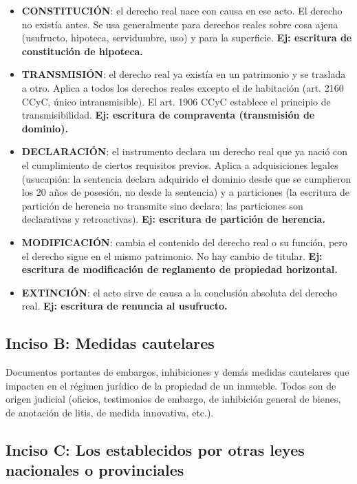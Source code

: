 \documentclass[12pt,oneside]{book}
\begin{document}
\begin{itemize}
    \item \textbf{CONSTITUCIÓN}: el derecho real nace con causa en ese acto. El derecho no existía antes. Se usa generalmente para derechos reales sobre cosa ajena (usufructo, hipoteca, servidumbre, uso) y para la superficie. \textbf{Ej: escritura de constitución de hipoteca.}
    \item \textbf{TRANSMISIÓN}: el derecho real ya existía en un patrimonio y se traslada a otro. Aplica a todos los derechos reales excepto el de habitación (art. 2160 CCyC, único intransmisible). El art. 1906 CCyC establece el principio de transmisibilidad. \textbf{Ej: escritura de compraventa (transmisión de dominio).}
    \item \textbf{DECLARACIÓN}: el instrumento declara un derecho real que ya nació con el cumplimiento de ciertos requisitos previos. Aplica a adquisiciones legales (usucapión: la sentencia declara adquirido el dominio desde que se cumplieron los 20 años de posesión, no desde la sentencia) y a particiones (la escritura de partición de herencia no transmite sino declara; las particiones son declarativas y retroactivas). \textbf{Ej: escritura de partición de herencia.}
    \item \textbf{MODIFICACIÓN}: cambia el contenido del derecho real o su función, pero el derecho sigue en el mismo patrimonio. No hay cambio de titular. \textbf{Ej: escritura de modificación de reglamento de propiedad horizontal.}
    \item \textbf{EXTINCIÓN}: el acto sirve de causa a la conclusión absoluta del derecho real. \textbf{Ej: escritura de renuncia al usufructo.}
\end{itemize}

\subsection{Inciso B: Medidas cautelares}
\label{subsec:inciso-b}

Documentos portantes de embargos, inhibiciones y demás medidas cautelares que impacten en el régimen jurídico de la propiedad de un inmueble. Todos son de origen judicial (oficios, testimonios de embargo, de inhibición general de bienes, de anotación de litis, de medida innovativa, etc.).

\subsection{Inciso C: Los establecidos por otras leyes nacionales o provinciales}
\label{subsec:inciso-c}
\end{document}
